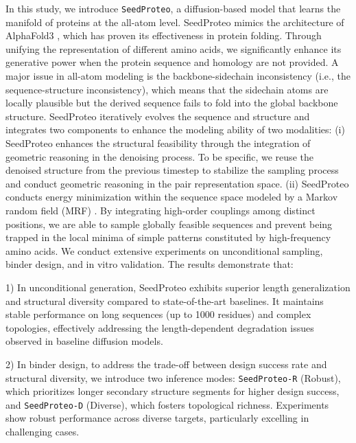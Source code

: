 \documentclass[]{bytedance_seed}
\begin{document}
In this study, we introduce \texttt{SeedProteo}, a diffusion-based model that learns the manifold of proteins at the all-atom level. SeedProteo mimics the architecture of AlphaFold3 \cite{abramsonAccurateStructurePrediction2024, wohlwendBoltz1DemocratizingBiomolecular2024, passaroAccurateEfficientBinding}, which has proven its effectiveness in protein folding. Through unifying the representation of different amino acids, we significantly enhance its generative power when the protein sequence and homology are not provided. A major issue in all-atom modeling is the backbone-sidechain inconsistency (i.e., the sequence-structure inconsistency), which means that the sidechain atoms are locally plausible but the derived sequence fails to fold into the global backbone structure. SeedProteo iteratively evolves the sequence and structure and integrates two components to enhance the modeling ability of two modalities:
(i) SeedProteo enhances the structural feasibility through the integration of geometric reasoning in the denoising process. To be specific, we reuse the denoised structure from the previous timestep \cite{chen2022analog} to stabilize the sampling process and conduct geometric reasoning in the pair representation space.
(ii) SeedProteo conducts energy minimization within the sequence space modeled by a Markov random field (MRF) \cite{metzler2005markov}. By integrating high-order couplings among distinct positions, we are able to sample globally feasible sequences and prevent being trapped in the local minima of simple patterns constituted by high-frequency amino acids.
We conduct extensive experiments on unconditional sampling, binder design, and in vitro validation. The results demonstrate that:

1) In unconditional generation, SeedProteo exhibits superior length generalization and structural diversity compared to state-of-the-art baselines. It maintains stable performance on long sequences (up to 1000 residues) and complex topologies, effectively addressing the length-dependent degradation issues observed in baseline diffusion models.


2) In binder design, to address the trade-off between design success rate and structural diversity, we introduce two inference modes: \texttt{SeedProteo-R} (Robust), which prioritizes longer secondary structure segments for higher design success, and \texttt{SeedProteo-D} (Diverse), which fosters topological richness. Experiments show robust performance across diverse targets, particularly excelling in challenging cases.
\end{document}
